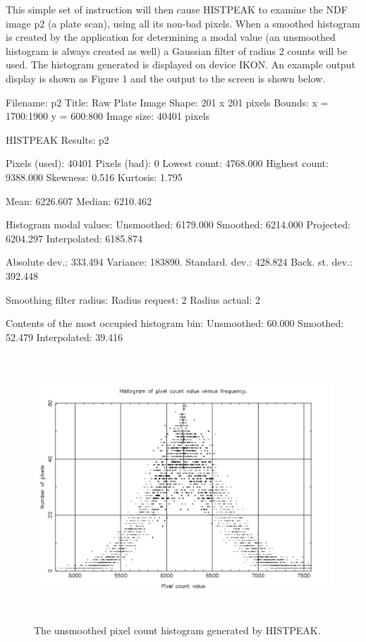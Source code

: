 \documentclass[twoside,11pt]{starlink}
\begin{document}
This simple set of instruction will then cause HISTPEAK to examine the
NDF image p2 (a plate scan), using all its non-bad pixels. When a smoothed
histogram is created by the application for determining a modal value (an
unsmoothed histogram is always
created as well) a Gaussian filter of radius 2 counts will be used. The
histogram generated is displayed on device IKON. An example output display
is shown as Figure 1 and the output to the screen is shown below.

\begin{terminalv}
Filename:   p2
Title:      Raw Plate Image
Shape:      201 x 201  pixels
Bounds:     x = 1700:1900  y = 600:800
Image size: 40401 pixels

HISTPEAK Results: p2

Pixels (used):              40401     Pixels (bad):                0
Lowest count:            4768.000     Highest count:        9388.000
Skewness:                   0.516     Kurtosis:                1.795

Mean:                    6226.607     Median:               6210.462

Histogram modal values:
Unsmoothed:              6179.000     Smoothed:             6214.000
Projected:               6204.297     Interpolated:         6185.874

Absolute dev.:            333.494     Variance:              183890.
Standard. dev.:           428.824     Back. st. dev.:        392.448

Smoothing filter radius:
Radius request:                 2     Radius actual:               2

Contents of the most occupied histogram bin:
Unsmoothed:                60.000     Smoothed:               52.479
Interpolated:              39.416
\end{terminalv}

\begin{figure}[htlb]
\centering
\includegraphics[width=151mm,height=100mm]{sun180_diag1}
\caption{The unsmoothed pixel count histogram generated by HISTPEAK.}
\end{figure}
\end{document}
